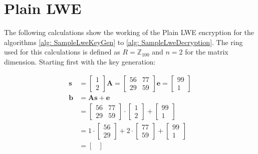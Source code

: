 \section{Plain LWE}
\label{app:PlainLweCalc}
The following calculations show the working of the Plain LWE encryption for the algorithms \ref{alg: SampleLweKeyGen} to \ref{alg: SampleLweDecryption}. The ring used for this calculations is defined as $R=\mathbb{Z}_{100}$ and $n=2$ for the matrix dimension. Starting first with the key generation:


\begin{align*}
  \textbf{s} & = \begin{bmatrix}1 \\ 2 \end{bmatrix}
  \textbf{A}  = \begin{bmatrix}56 & 77 \\ 29 & 59 \end{bmatrix}
  \textbf{e}  = \begin{bmatrix}99 \\ 1 \end{bmatrix}               \\
  \textbf{b} & = \textbf{A}\textbf{s} +\textbf{e}                  \\
             & = \begin{bmatrix}
                   56 & 77  \\
                   29 & 59
                 \end{bmatrix}
  \cdot
  \begin{bmatrix}
    1 \\
    2
  \end{bmatrix}
  +
  \begin{bmatrix}
    99 \\ 
    1 
  \end{bmatrix}
  \\
             & = 1
  \cdot
  \begin{bmatrix}
    56 \\
    29
  \end{bmatrix}
  + 2 
  \cdot
  \begin{bmatrix}
    77 \\ 
    59 
  \end{bmatrix}
  + 
  \begin{bmatrix}
    99 \\ 
    1 
  \end{bmatrix}                                                  \\
             & = \begin{bmatrix}

\end{bmatrix}
\end{align*}
